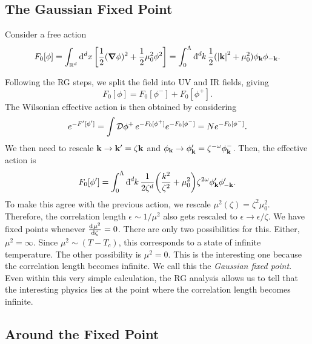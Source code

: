 \subsection{The Gaussian Fixed Point}%
\label{sub:the_gaussian_fixed_point}

Consider a free action
\begin{equation}
  F_0 [\phi] = \int_{\mathbb{R}^d} \dd[d]{x} \left[ \frac{1}{2} (\grad \phi)^2 + \frac{1}{2} \mu_0^2 \phi^2 \right] = \int_0^\Lambda \bdd[d]{k} \frac{1}{2}( \abs{\vb{k}}^2 + \mu_0^2) \phi_{\vb{k}} \phi_{-\vb{k}}.
\end{equation}

Following the RG steps, we split the field into UV and IR fields, giving
\begin{equation}
  \label{eq:l10gauss}
  F_0[\phi] = F_0[\phi^-] + F_0[\phi^+].
\end{equation}
The Wilsonian effective action is then obtained by considering
\begin{equation}
  e^{-F'[\phi']} = \int \pdd{\phi^+} e^{-F_0[\phi^+]} e^{-F_0[\phi^-]} = N e^{-F_0[\phi^-]}.
\end{equation}
We then need to rescale $\vb{k} \to \vb{k}' = \zeta \vb{k}$ and $\phi_{\vb{k}} \to \phi_{\vb{k}}' = \zeta^{-\omega} \phi^-_{\vb{k}}$.
Then, the effective action is
\begin{equation}
  F_0[\phi'] = \int_0^{\Lambda} \bdd[d]{k} \frac{1}{2 \zeta^d} \qty(\frac{k^2}{\zeta^2} + \mu_0^2) \zeta^{2\omega} \phi'_{\vb{k}} \phi'_{-\vb{k}}.
\end{equation}
To make this agree with the previous action, we rescale $\mu^2 (\zeta) = \zeta^2 \mu_0^2$.
Therefore, the correlation length $\epsilon \sim 1/\mu^2$ also gets rescaled to $\epsilon \to \epsilon/\zeta$.
We have fixed points whenever $\dv[]{\mu^2}{\zeta} = 0$. There are only two possibilities for this. Either, $\mu^2 = \infty$. Since $\mu^2 \sim (T - T_c)$, this corresponds to a state of infinite temperature.
The other possibility is $\mu^2 = 0$. This is the interesting one because the correlation length becomes infinite. We call this the \emph{Gaussian fixed point}.
Even within this very simple calculation, the RG analysis allows us to tell that the interesting physics lies at the point where the correlation length becomes infinite.

\subsection*{Around the Fixed Point}%

